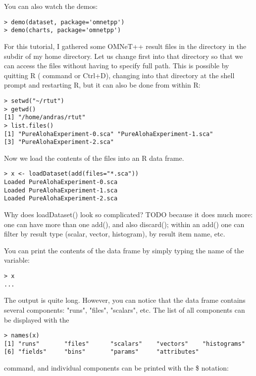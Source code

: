 You can also watch the demos:

\begin{verbatim}
> demo(dataset, package='omnetpp')
> demo(charts, package='omnetpp')
\end{verbatim}

For this tutorial, I gathered some OMNeT++ result files in the directory 
in the  subdir of my home directory. Let us change first into that 
directory so that we can access the files without having to specify 
full path. This is possible by quitting R ( command or Ctrl+D), 
changing into that directory at the shell prompt and restarting R, 
but it can also be done from within R:

\begin{verbatim}
> setwd("~/rtut")
> getwd()
[1] "/home/andras/rtut"
> list.files()
[1] "PureAlohaExperiment-0.sca" "PureAlohaExperiment-1.sca"
[3] "PureAlohaExperiment-2.sca"
\end{verbatim}

Now we load the contents of the files into an R data frame.

\begin{verbatim}
> x <- loadDataset(add(files="*.sca"))
Loaded PureAlohaExperiment-0.sca
Loaded PureAlohaExperiment-1.sca
Loaded PureAlohaExperiment-2.sca
\end{verbatim}

Why does loadDataset() look so complicated?  TODO because it does much more: one can have more than one add(), and also discard(); within an add() one can filter by result type (scalar, vector, histogram), by result item name, etc.

You can print the contents of the data frame by simply typing the name of the variable:

\begin{verbatim}
> x
...
\end{verbatim}

The output is quite long. However, you can notice that the data frame contains several components:
"runs", "files", "scalars", etc. The list of all components can be displayed with the

\begin{verbatim}
> names(x)
[1] "runs"       "files"      "scalars"    "vectors"    "histograms"
[6] "fields"     "bins"       "params"     "attributes"
\end{verbatim}

command, and individual components can be printed with the \$ notation:

